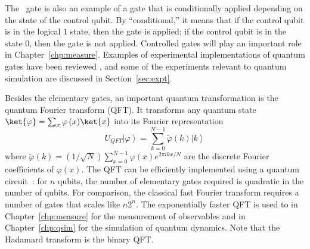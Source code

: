 \documentclass[11pt,oneside,final]{huthesis}%
\begin{document}
The \cnot~gate is also an example of a gate that is conditionally applied depending on the state of the control qubit. By ``conditional,'' it means that if the control qubit is in the logical 
$1$  state, then the gate is applied; if the control qubit is in the state $0$, then the gate is not applied.  Controlled gates will play an important role in Chapter~\ref{chp:measure}.
Examples of experimental implementations of quantum gates have been reviewed
\cite{Ladd10}, and some of the experiments relevant to quantum
simulation are discussed in Section~\ref{sec:expt}.

Besides the elementary gates, an important quantum transformation is the quantum
Fourier transform (QFT). It transforms any quantum state $\ket{\varphi}  =
\sum\nolimits_x {\varphi \left( x \right)} \ket{x}$  into its Fourier
representation
\begin{equation}
U_{QFT} \left| \varphi  \right\rangle  = \sum\limits_{k=0}^{N-1} {\tilde \varphi
\left( k \right)} \left| k \right\rangle
\end{equation}
where $\tilde \varphi(k) = (1/\sqrt N )\sum\nolimits_{x=0}^{N-1} \varphi(x)
e^{2\pi ikx/N}$ are the discrete Fourier coefficients of $\varphi(x)$.  The QFT
can be efficiently implemented using a quantum circuit~\cite{Nielsen00}: for
$n$ qubits, the number of elementary gates required is quadratic in the number of qubits. For comparison,
the classical fast Fourier transform requires a number of gates that scales like $n2^n$. The exponentially faster QFT is used to in Chapter~\ref{chp:measure} for the measurement of observables and in Chapter~\ref{chp:qsim} for the simulation of quantum dynamics.
Note that the Hadamard transform is the binary QFT.
\end{document}
